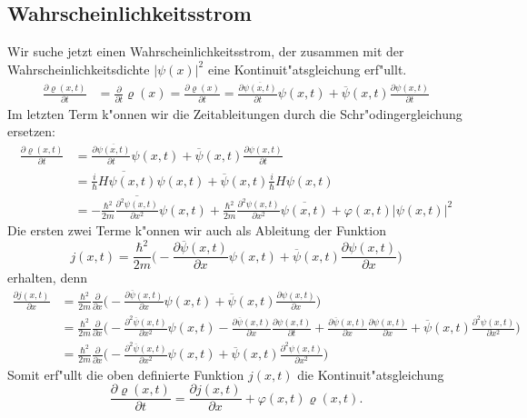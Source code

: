 \subsection{Wahrscheinlichkeitsstrom}
Wir suche jetzt einen Wahrscheinlichkeitsstrom, der zusammen mit
der Wahrscheinlichkeitsdichte $|\psi(x)|^2$ eine Kontinuit"atsgleichung
erf"ullt.
\begin{align*}
\frac{\partial\varrho(x,t)}{\partial t}
&=
\frac{\partial}{\partial t} \varrho(x)
=
\frac{\partial\varrho(x)}{\partial t}
=
\frac{\partial\overline{\psi(x,t)}}{\partial t}\psi(x,t)
+
\overline{\psi}(x,t)\frac{\partial\psi(x,t)}{\partial t}
\end{align*}
Im letzten Term k"onnen wir die Zeitableitungen durch die
Schr"odingergleichung ersetzen:
\begin{align*}
\frac{\partial\varrho(x,t)}{\partial t}
&=
\frac{\partial\overline{\psi(x,t)}}{\partial t}\psi(x,t)
+
\overline{\psi}(x,t)\frac{\partial\psi(x,t)}{\partial t}
\\
&=
\overline{ \frac{i}{\hbar}H \psi(x,t) }\psi(x,t)
+
\overline{\psi}(x,t)\frac{i}{\hbar} H \psi(x,t)
\\
&=
-
\frac{\hbar^2}{2m}\overline{\frac{\partial^2\psi(x,t)}{\partial x^2}}\psi(x,t)
+
\frac{\hbar^2}{2m}\frac{\partial^2\psi(x,t)}{\partial x^2}\overline{\psi(x,t)}
+
\varphi(x,t)|\psi(x,t)|^2
\end{align*}
Die ersten zwei Terme k"onnen wir auch als Ableitung
der Funktion
\[
j(x,t)=
\frac{\hbar^2}{2m}
\biggl(
-\frac{\partial\overline{\psi}(x,t)}{\partial x}\psi(x,t)
+\overline{\psi}(x,t)\frac{\partial\psi(x,t)}{\partial x}
\biggr)
\]
erhalten, denn
\begin{align*}
\frac{\partial j(x,t)}{\partial x}
&=
\frac{\hbar^2}{2m}
\frac{\partial}{\partial x}
\biggl(
-\frac{\partial\overline{\psi}(x,t)}{\partial x}\psi(x,t)
+\overline{\psi}(x,t)\frac{\partial\psi(x,t)}{\partial x}
\biggr)
\\
&=
\frac{\hbar^2}{2m}
\frac{\partial}{\partial x}
\biggl(
-
\frac{\partial^2\overline{\psi}(x,t)}{\partial x^2}
\psi(x,t)
-
\frac{\partial\overline{\psi}(x,t)}{\partial x}
\frac{\partial\psi(x,t)}{\partial t}
+
\frac{\partial\overline{\psi}(x,t)}{\partial x}
\frac{\partial\psi(x,t)}{\partial x}
+
\overline{\psi}(x,t)
\frac{\partial^2\psi(x,t)}{\partial x^2}
\biggr)
\\
&=
\frac{\hbar^2}{2m}
\frac{\partial}{\partial x}
\biggl(
-
\frac{\partial^2\overline{\psi}(x,t)}{\partial x^2}
\psi(x,t)
+
\overline{\psi}(x,t)
\frac{\partial^2\psi(x,t)}{\partial x^2}
\biggr)
\end{align*}
Somit erf"ullt die oben definierte Funktion $j(x,t)$ die
Kontinuit"atsgleichung
\[
\frac{\partial\varrho(x,t)}{\partial t}
=
\frac{\partial j(x,t)}{\partial x} +\varphi(x,t)\varrho(x,t).
\]





